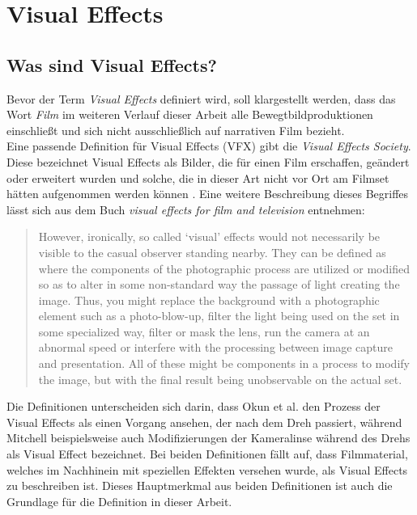 \chapter{Visual Effects}
\thispagestyle{fancy}
\section{Was sind Visual Effects?}
Bevor der Term \textit{Visual Effects} definiert wird, soll klargestellt werden, dass das Wort \textit{Film} im weiteren Verlauf dieser Arbeit alle Bewegtbildproduktionen einschließt und sich nicht ausschließlich auf narrativen Film bezieht.\\

Eine passende Definition für Visual Effects (VFX) gibt die \textit{Visual Effects Society}. Diese bezeichnet Visual Effects als Bilder, die für einen Film erschaffen, geändert oder erweitert wurden und solche, die in dieser Art nicht vor Ort am Filmset hätten aufgenommen werden können \parencite[S. 2]{okun2020ves}. Eine weitere Beschreibung dieses Begriffes lässt sich aus dem Buch \textit{visual effects for film and
television} entnehmen: 
\begin{quote}
\glqq However, ironically, so called ‘visual’ effects would not necessarily be visible
to the casual observer standing nearby. They can be defined as where the components of the photographic process are utilized or modified so as to alter in
some non-standard way the passage of light creating the image. Thus, you might
replace the background with a photographic element such as a photo-blow-up,
filter the light being used on the set in some specialized way, filter or mask the
lens, run the camera at an abnormal speed or interfere with the processing
between image capture and presentation. All of these might be components in a
process to modify the image, but with the final result being unobservable on the
actual set.\grqq{} \parencite[S. 9]{mitchell2013visual}\end{quote}

Die Definitionen unterscheiden sich darin, dass Okun et al. den Prozess der Visual Effects als einen Vorgang ansehen, der nach dem Dreh passiert, während Mitchell beispielsweise auch Modifizierungen der Kameralinse während des Drehs als Visual Effect bezeichnet. Bei beiden Definitionen fällt auf, dass Filmmaterial, welches im Nachhinein mit speziellen Effekten versehen wurde, als Visual Effects zu beschreiben ist. Dieses Hauptmerkmal aus beiden Definitionen ist auch die Grundlage für die Definition in dieser Arbeit. \\

